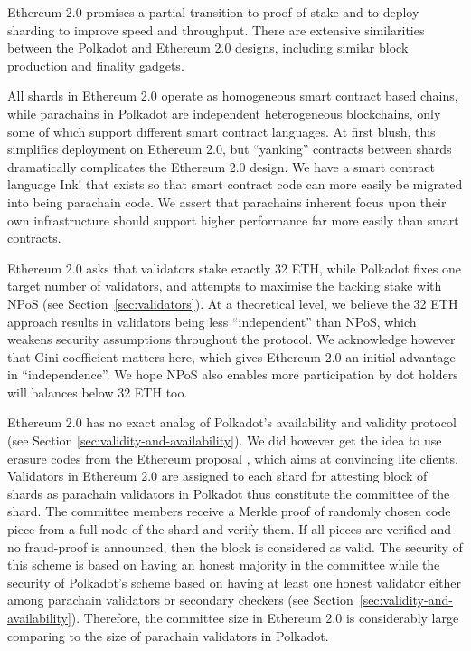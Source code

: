 Ethereum 2.0 promises a partial transition to proof-of-stake and to deploy sharding to improve speed and throughput.  There are extensive similarities between the Polkadot and Ethereum 2.0 designs, including similar block production and finality gadgets.  

All shards in Ethereum 2.0 operate as homogeneous smart contract based chains, while parachains in Polkadot are independent heterogeneous blockchains, only some of which support different smart contract languages.  
At first blush, this simplifies deployment on Ethereum 2.0, but ``yanking'' contracts between shards dramatically complicates the Ethereum 2.0 design.  We have a smart contract language Ink! that exists so that smart contract code can more easily be migrated into being parachain code.  We assert that parachains inherent focus upon their own infrastructure should support higher performance far more easily than smart contracts.

Ethereum 2.0 asks that validators stake exactly 32 ETH, while Polkadot fixes one target number of validators, and attempts to maximise the backing stake with NPoS (see Section~\ref{sec:validators}).  At a theoretical level, we believe the 32 ETH approach results in validators being less ``independent'' than NPoS, which weakens security assumptions throughout the protocol.  We acknowledge however that Gini coefficient matters here, which gives Ethereum 2.0 an initial advantage in ``independence''.  We hope NPoS also enables more participation by dot holders will balances below 32 ETH too.

Ethereum 2.0 has no exact analog of Polkadot's availability and validity protocol (see Section \ref{sec:validity-and-availability}).  We did however get the idea to use erasure codes from the Ethereum proposal \cite{availabilityETH2}, which aims at convincing lite clients.  
Validators in Ethereum 2.0 are assigned to each shard for attesting block of shards as parachain validators in Polkadot thus constitute the committee of the shard. The committee members receive a Merkle proof of randomly chosen code piece from a full node of the shard and verify them. If all pieces are verified and no fraud-proof is announced, then the block is considered as valid. The security of this scheme is based on having an honest majority in the committee while the security of Polkadot's scheme based on having at least one honest validator either among parachain validators or secondary checkers (see Section~\ref{sec:validity-and-availability}). Therefore, the committee size in Ethereum 2.0 is considerably large comparing to the size of parachain validators in Polkadot. 

